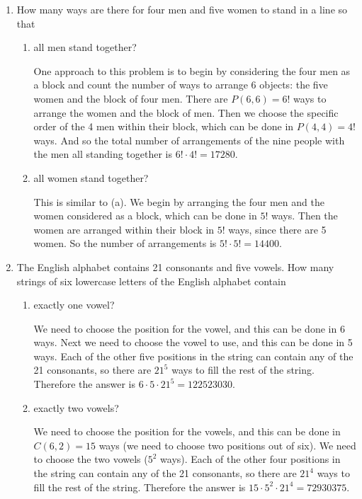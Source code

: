 \documentclass[11pt]{article}
\begin{document}
\begin{enumerate}[label=\textbf{\arabic*.}]
	\item How many ways are there for four men and five women to stand in a line so that
	
	\begin{enumerate}[label=\textbf{\alph*)}]
		\item all men stand together?
		
		One approach to this problem is to begin by considering the four men as a block and count the number of ways to arrange 6 objects: the five women and the block of four men. There are $P(6, 6) = 6!$ ways to arrange the women and the block of men. Then we choose the specific order of the 4 men within their block, which can be done in $P(4, 4) = 4!$ ways. And so the total number of arrangements of the nine people with the men all standing together is $6! \cdot 4! = 17280$.
		
		\item all women stand together?
		
		This is similar to (a). We begin by arranging the four men and the women considered as a block, which can be done in $5!$ ways. Then the women are arranged within their block in $5!$ ways, since there are 5 women. So the number of arrangements is $5! \cdot 5! = 14400$.
	\end{enumerate}

	\item The English alphabet contains 21 consonants and five vowels. How many strings of six lowercase letters of the English alphabet contain
	
	\begin{enumerate}[label=\textbf{\alph*)}]
		\item exactly one vowel?
		
		We need to choose the position for the vowel, and this can be done in 6 ways. Next we need to choose the vowel to use, and this can be done in 5 ways. Each of the other five positions in the string can contain any of the 21 consonants, so there are $21^5$ ways to fill the rest of the string. Therefore the answer is $6 \cdot 5 \cdot 21^5 = 122523030$.
		
		\item exactly two vowels?
		
		We need to choose the position for the vowels, and this can be done in $C(6, 2) = 15$ ways (we need to choose two positions out of six). We need to choose the two vowels ($5^2$ ways). Each of the other four positions in the string can contain any of the 21 consonants, so there are $21^4$ ways to fill the rest of the string. Therefore the answer is $15 \cdot 5^2 \cdot 21^4 = 72930375$.
		

\end{enumerate}
\end{enumerate}
\end{document}
